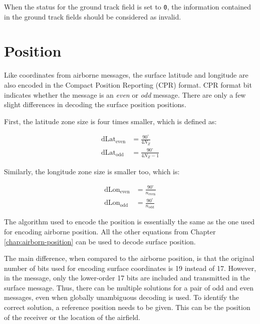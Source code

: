When the status for the ground track field is set to \texttt{0}, the information contained in the ground track fields should be considered as invalid.

\section{Position}

Like coordinates from airborne messages, the surface latitude and longitude are also encoded in the Compact Position Reporting (CPR) format. CPR format bit indicates whether the message is an \emph{even} or \emph{odd} message. There are only a few slight differences in decoding the surface position positions. 

First, the latitude zone size is four times smaller, which is defined as:

\begin{equation}
\begin{split}
    \mathrm{dLat}_\mathrm{even} &= \frac{90^\circ}{4 N_Z} \\
    \mathrm{dLat}_\mathrm{odd} &= \frac{90^\circ}{4 N_Z - 1}
\end{split}
\end{equation}

Similarly, the longitude zone size is smaller too, which is:

\begin{equation}
\begin{split}
    \mathrm{dLon}_\mathrm{even} &= \frac{90^\circ}{n_\mathrm{even}} \\
    \mathrm{dLon}_\mathrm{odd} &= \frac{90^\circ}{n_\mathrm{odd}}
\end{split}
\end{equation}

The algorithm used to encode the position is essentially the same as the one used for encoding airborne position. All the other equations from Chapter \ref{chap:airborn-position} can be used to decode surface position.

The main difference, when compared to the airborne position, is that the original number of bits used for encoding surface coordinates is 19 instead of 17. However, in the message, only the lower-order 17 bits are included and transmitted in the surface message. Thus, there can be multiple solutions for a pair of odd and even messages, even when globally unambiguous decoding is used. To identify the correct solution, a reference position needs to be given. This can be the position of the receiver or the location of the airfield.

